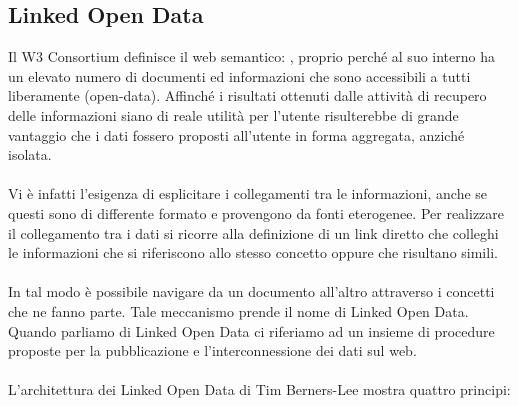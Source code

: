 \documentclass{article}
\theoremstyle{plain}
\theoremstyle{definition}
\begin{document}
\subsection{Linked Open Data}
Il W3 Consortium definisce il web semantico: , proprio perché al suo interno ha un elevato numero di documenti ed informazioni che sono accessibili a tutti liberamente (open-data). Affinché i risultati ottenuti dalle attività di recupero delle informazioni siano di reale utilità per l'utente risulterebbe di grande vantaggio che i dati fossero proposti all'utente in forma aggregata, anziché isolata.
\\
\\
Vi è infatti l'esigenza di esplicitare i collegamenti tra le informazioni, anche se questi sono di differente formato e provengono da fonti eterogenee. Per realizzare il collegamento tra i dati si ricorre alla definizione di un link diretto che colleghi le informazioni che si riferiscono allo stesso concetto oppure che risultano simili.
\\
\\
In tal modo è possibile navigare da un documento all'altro attraverso i concetti che ne fanno parte. Tale meccanismo prende il nome di Linked Open Data. Quando parliamo di Linked Open Data ci riferiamo ad un insieme di procedure proposte per la pubblicazione e l'interconnessione dei dati sul web.
\\
\\
L'architettura dei Linked Open Data di Tim Berners-Lee mostra quattro principi:
\end{document}
